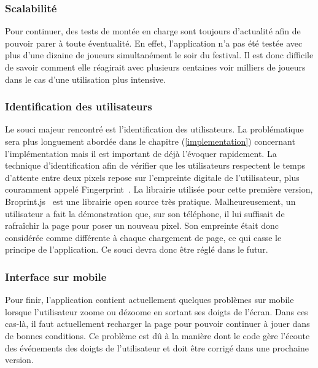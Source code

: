 \subsubsection{Scalabilité}
Pour continuer, des tests de montée en charge sont toujours d'actualité afin de pouvoir parer à toute éventualité. En effet, l'application n'a pas été testée avec plus d'une dizaine de joueurs simultanément le soir du festival. Il est donc difficile de savoir comment elle réagirait avec plusieurs centaines voir milliers de joueurs dans le cas d'une utilisation plus intensive.

\subsubsection{Identification des utilisateurs}
Le souci majeur rencontré est l'identification des utilisateurs. La problématique sera plus longuement abordée dans le chapitre (\ref{implementation}) concernant l'implémentation mais il est important de déjà l'évoquer rapidement. La technique d'identification afin de vérifier que les utilisateurs respectent le temps d'attente entre deux pixels repose sur l'empreinte digitale de l'utilisateur, plus couramment appelé Fingerprint~\cite{devicefingerprint}. La librairie utilisée pour cette première version, Broprint.js~\cite{broprintjs} est une librairie open source très pratique. Malheureusement, un utilisateur a fait la démonstration que, sur son téléphone, il lui suffisait de rafraîchir la page pour poser un nouveau pixel. Son empreinte était donc considérée comme différente à chaque chargement de page, ce qui casse le principe de l'application. Ce souci devra donc être réglé dans le futur.

\subsubsection{Interface sur mobile}
Pour finir, l'application contient actuellement quelques problèmes sur mobile lorsque l'utilisateur zoome ou dézoome en sortant ses doigts de l'écran. Dans ces cas-là, il faut actuellement recharger la page pour pouvoir continuer à jouer dans de bonnes conditions. Ce problème est dû à la manière dont le code gère l'écoute des événements des doigts de l'utilisateur et doit être corrigé dans une prochaine version.

